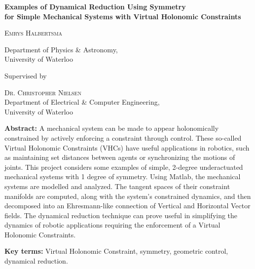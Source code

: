 \thispagestyle{plain}
\begin{center}
    \Large{
    \textbf{Examples of Dynamical Reduction Using Symmetry \\for Simple Mechanical Systems with Virtual Holonomic Constraints}
    }
        
    \vspace{0.4cm}
    \large{\scshape
    Emrys Halbertsma
    }\\
    \normalsize{
        Department of Physics \& Astronomy,\\
        University of Waterloo
    
        \vspace{0.4cm}
        Supervised by\\}
    \large{\scshape
    Dr. Christopher Nielsen
    }\\
    \normalsize{
        Department of Electrical \& Computer Engineering,\\
        University of Waterloo
    }
    \vspace{1.0cm}
    
\begin{minipage}{0.85\textwidth}
\normalsize
    \textbf{Abstract:} A mechanical system can be made to appear holonomically constrained by actively enforcing a constraint through control. These so-called Virtual Holonomic Constraints (VHCs) have useful applications in robotics, such as maintaining set distances between agents or synchronizing the motions of joints. 
This project considers some examples of simple, 2-degree underactuated mechanical systems with 1 degree of symmetry. Using Matlab, the mechanical systems are modelled and analyzed. The tangent spaces of their constraint manifolds are computed, along with the system's constrained dynamics, and then decomposed into an Ehresmann-like connection of Vertical and Horizontal Vector fields. The dynamical reduction technique can prove useful in simplifying the dynamics of robotic applications requiring the enforcement of a Virtual Holonomic Constraints.
\vspace{5mm}

\small\textbf{Key terms:} Virtual Holonomic Constraint, symmetry, geometric control, dynamical reduction.
\end{minipage}
\end{center}